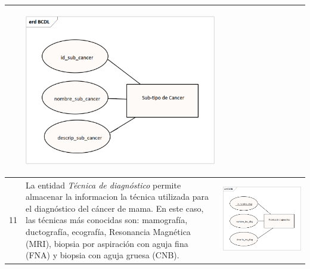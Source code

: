 \begin{table}[htb!]
\begin{threeparttable}
\begin{tabular}{p{0.5cm} p{7cm} p{7cm}}
			& \begin{center}\includegraphics[width=1\linewidth]{MER/IMAGENES_MER/10_SUBTIPO_CANCER}\end{center}
			\\ \hline
			11
			& La entidad \textit{Técnica de diagnóstico} permite almacenar la informacion la técnica utilizada para el diagnóstico del cáncer de mama. En este caso, las técnicas más conocidas son: mamografía, ductografía, ecografía, Resonancia Magnética (MRI), biopsia por aspiración con aguja fina (FNA) y biopsia con aguja gruesa (CNB).
			& \begin{center}\includegraphics[width=1\linewidth]{MER/IMAGENES_MER/11_TECNICA_DIAGNOSTICO}\end{center}
			\\ \hline
		\end{tabular}
	\end{threeparttable}
\end{table}

